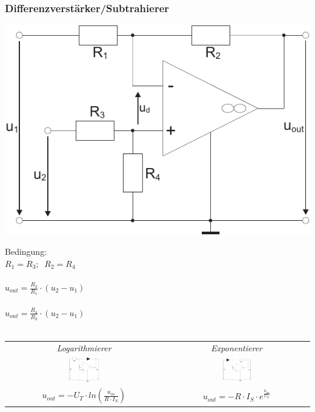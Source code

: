\documentclass[a4paper,twocolumn,10pt]{article}
\begin{document}
\subsubsection*{Differenzverstärker/Subtrahierer}
\begin{minipage}[b]{0.25\textwidth}
\includegraphics[width=\textwidth]{Grafiken/OP_PDiffV}
\end{minipage}
\hfill
\begin{minipage}[b]{0.2\textwidth}
Bedingung:\\
$R_1=R_3;\;\;R_2=R_4$\\\\
$u_{out}=\frac{R_2}{R_1}\cdot (u_2-u_1)$\\\\
$u_{out}=\frac{R_4}{R_3}\cdot (u_2-u_1)$\\\\
\end{minipage}

\begin{tabular}{c|c}
	\emph{Logarithmierer} & \emph{Exponentierer}\\
	\includegraphics[width=0.2\textwidth]{Grafiken/OP_Log} & \includegraphics[width=0.2\textwidth]{Grafiken/OP_Exp}\\
	$u_{out}=-U_T\cdot ln(\frac{u_{in}}{R\cdot I_S})$ & 
	$u_{out}=-R\cdot I_S\cdot e^{\frac{u_{in}}{U_T}}$
\end{tabular}
\end{document}
